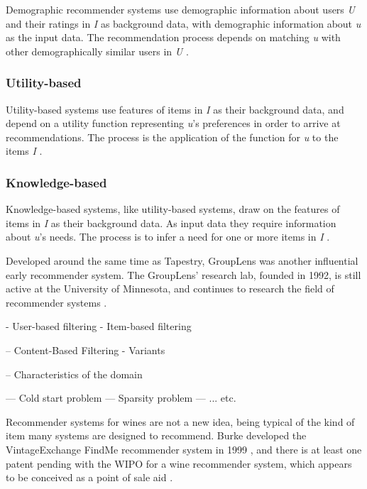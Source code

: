 Demographic recommender systems use demographic information about users \textit{U} and their ratings in \textit{I} as background data, with demographic information about \textit{u} as the input data. The recommendation process depends on matching \textit{u} with other demographically similar users in \textit{U} \cite{Burke02}.

\subsubsection{Utility-based}

Utility-based systems use features of items in \textit{I} as their background data, and depend on a utility function representing \textit{u}'s preferences in order to arrive at recommendations. The process is the application of the function for \textit{u} to the items \textit{I} \cite{Burke02}.

\subsubsection{Knowledge-based}

Knowledge-based systems, like utility-based systems, draw on the features of items in \textit{I} as their background data. As input data they require information about \textit{u}'s needs. The process is to infer a need for one or more items in \textit{I} \cite{Burke02}.





Developed around the same time as Tapestry, GroupLens \cite{Resnick94} was another influential early recommender system. The GroupLens' research lab, founded in 1992, is still active at the University of Minnesota, and continues to research the field of recommender systems \cite{GroupLensOrg}.


  - User-based filtering
  - Item-based filtering

-- Content-Based Filtering
  - Variants

-- Characteristics of the domain

--- Cold start problem
--- Sparsity problem
--- ... etc.


Recommender systems for wines are not a new idea, being typical of the kind of item many systems are designed to recommend. Burke developed the VintageExchange FindMe recommender system in 1999 \cite{Burke99}, and there is at least one patent pending with the WIPO for a wine recommender system, which appears to be conceived as a point of sale aid \cite{WIPO12}.

